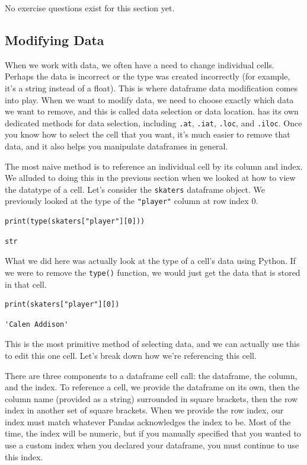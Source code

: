 No exercise questions exist for this section yet.

\subsection{Modifying Data}
When we work with data, we often have a need to change individual cells. Perhaps the data is incorrect or the type was created incorrectly (for example, it's a string instead of a float). This is where dataframe data modification comes into play. When we want to modify data, we need to choose exactly which data we want to remove, and this is called data selection or data location.  has its own dedicated methods for data selection, including \verb|.at|, \verb|.iat|, \verb|.loc|, and \verb|.iloc|. Once you know how to select the cell that you want, it's much easier to remove that data, and it also helps you manipulate dataframes in general.\par
The most naive method is to reference an individual cell by its column and index. We alluded to doing this in the previous section when we looked at how to view the datatype of a cell. Let's consider the \verb|skaters| dataframe object. We previously looked at the type of the \verb|"player"| column at row index 0.\par
\begin{lstlisting}[style=pippython]
print(type(skaters["player"][0]))
\end{lstlisting}
\begin{lstlisting}[style=none]
str
\end{lstlisting}
What we did here was actually look at the type of a cell's data using Python. If we were to remove the \verb|type()| function, we would just get the data that is stored in that cell.\par
\begin{lstlisting}[style=pippython]
print(skaters["player"][0])
\end{lstlisting}
\begin{lstlisting}[style=none]
'Calen Addison'
\end{lstlisting}
This is the most primitive method of selecting data, and we can actually use this to edit this one cell. Let's break down how we're referencing this cell.\par
There are three components to a dataframe cell call: the dataframe, the column, and the index. To reference a cell, we provide the dataframe on its own, then the column name (provided as a string) surrounded in square brackets, then the row index in another set of square brackets. When we provide the row index, our index must match whatever Pandas acknowledges the index to be. Most of the time, the index will be numeric, but if you manually specified that you wanted to use a custom index when you declared your dataframe, you must continue to use this index.\par
